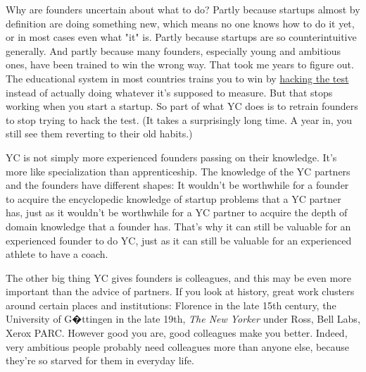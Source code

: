 Why are founders
                  uncertain about what to do? Partly because startups almost by
                  definition are doing something new, which means no one knows
                  how to do it yet, or in most cases even what "it" is. Partly
                  because startups are so counterintuitive generally. And partly
                  because many founders, especially young and ambitious ones,
                  have been trained to win the wrong way. That took me years to
                  figure out. The educational system in most countries trains
                  you to win by
                  \href{http://www.paulgraham.com/lesson.html}{hacking the test}
                  instead of actually doing whatever it's supposed to measure.
                  But that stops working when you start a startup. So part of
                  what YC does is to retrain founders to stop trying to hack the
                  test. (It takes a surprisingly long time. A year in, you still
                  see them reverting to their old habits.)

YC is not
                  simply more experienced founders passing on their knowledge.
                  It's more like specialization than apprenticeship. The
                  knowledge of the YC partners and the founders have different
                  shapes: It wouldn't be worthwhile for a founder to acquire the
                  encyclopedic knowledge of startup problems that a YC partner
                  has, just as it wouldn't be worthwhile for a YC partner to
                  acquire the depth of domain knowledge that a founder has.
                  That's why it can still be valuable for an experienced founder
                  to do YC, just as it can still be valuable for an experienced
                  athlete to have a coach.

The other big thing YC
                  gives founders is colleagues, and this may be even more
                  important than the advice of partners. If you look at history,
                  great work clusters around certain places and institutions:
                  Florence in the late 15th century, the University of G�ttingen
                  in the late 19th, \emph{The New Yorker} under Ross, Bell Labs,
                  Xerox PARC. However good you are, good colleagues make you
                  better. Indeed, very ambitious people probably need colleagues
                  more than anyone else, because they're so starved for them in
                  everyday life.

